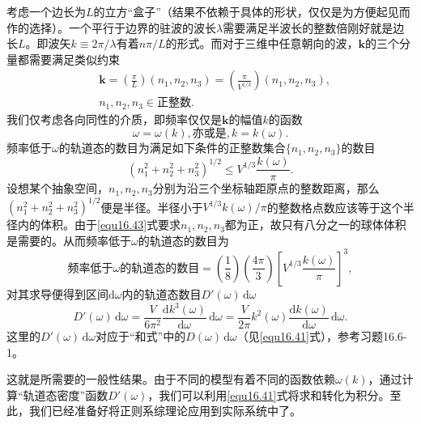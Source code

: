 考虑一个边长为$L$的立方``盒子''（结果不依赖于具体的形状，仅仅是为方便起见而作的选择）。一个平行于边界的驻波的波长$\lambda$需要满足半波长的整数倍刚好就是边长$L$。即波矢$k\equiv 2\pi/\lambda$有着$n\pi/L$的形式。而对于三维中任意朝向的波，$\mathbf k$的三个分量都需要满足类似约束
\begin{equation}
\begin{aligned}
&{\mathbf k}=\left(\frac{\pi}{L}\right)(n_1,n_2,n_3)=\left(\frac{\pi}{V^{1/3}}\right)(n_1,n_2,n_3),\\
&n_1,n_2,n_3\in \text{正整数}.
\label{equ16.43}
\end{aligned}
\end{equation}
我们仅考虑各向同性的介质，即频率仅仅是$\mathbf k$的幅值$k$的函数
\begin{equation}
\omega=\omega(k),\text{亦或是},k=k(\omega).
\end{equation}
频率低于$\omega$的轨道态的数目为满足如下条件的正整数集合$\{n_1,n_2,n_3\}$的数目
\begin{equation}
(n_1^2+n_2^2+n_3^2)^{1/2}\le V^{1/3}\frac{k(\omega)}{\pi}.
\end{equation}
设想某个抽象空间，$n_1,n_2,n_3$分别为沿三个坐标轴距原点的整数距离，那么$(n_1^2+n_2^2+n_3^2)^{1/2}$便是半径。半径小于$V^{1/3}k(\omega)/\pi$的整数格点数应该等于这个半径内的体积。由于\eqref{equ16.43}式要求$n_1,n_2,n_3$都为正，故只有八分之一的球体体积是需要的。从而频率低于$\omega$的轨道态的数目为
\begin{equation}
\text{频率低于$\omega$的轨道态的数目}=\left(\frac{1}{8}\right)\left(\frac{4\pi}{3}\right)\left[V^{1/3}\frac{k(\omega)}{\pi}\right]^3,
\end{equation}
对其求导便得到区间$\mathrm d\omega$内的轨道态数目$D'(\omega)\,\mathrm d\omega$
\begin{equation}
D'(\omega)\,\mathrm d\omega = \frac{V}{6\pi^2}\frac{\mathrm dk^3(\omega)}{\mathrm d\omega}\,\mathrm d\omega=\frac{V}{2\pi}k^2(\omega)\frac{\mathrm dk(\omega)}{\mathrm d\omega}\,\mathrm d\omega.
\label{equ16.47}
\end{equation}
这里的$D'(\omega)\,\mathrm d\omega$对应于``和式''中的$D(\omega)\,\mathrm d\omega$（见\eqref{equ16.41}式），参考习题16.6-1。

这就是所需要的一般性结果。由于不同的模型有着不同的函数依赖$\omega(k)$，通过计算``轨道态密度''函数$D'(\omega)$，我们可以利用\eqref{equ16.41}式将求和转化为积分。至此，我们已经准备好将正则系综理论应用到实际系统中了。

